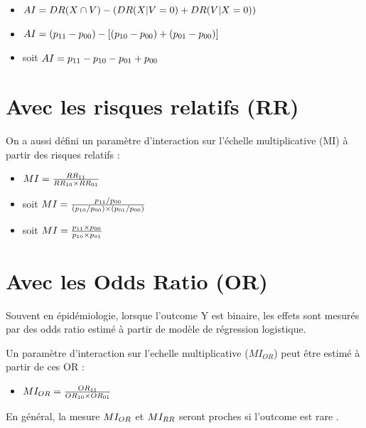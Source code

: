 \documentclass[
]{book}
\providecommand{\tightlist}{%
  \setlength{\itemsep}{0pt}\setlength{\parskip}{0pt}}
\begin{document}
\begin{itemize}
\tightlist
\item
  \(\small AI = DR(X\cap V) - (DR(X|V=0) + DR(V|X=0))\)
\item
  \(\small AI = (p_{11} - p_{00}) - [(p_{10} - p_{00}) + (p_{01} - p_{00})]\)
\item
  soit \(\small AI =p_{11} - p_{10} - p_{01} + p_{00}\)
\end{itemize}

\hypertarget{avec-les-risques-relatifs-rr}{%
\section{Avec les risques relatifs (RR)}\label{avec-les-risques-relatifs-rr}}

On a aussi défini un paramètre d'interaction sur l'échelle multiplicative (MI) à partir des risques relatifs \citet{vanderweele_tutorial_2014} :

\begin{itemize}
\tightlist
\item
  \(\small MI = \frac{RR_{11}}{RR_{10} \times RR_{01}}\)
\item
  soit \(\small MI = \frac{p_{11} / p_{00}}{(p_{10} / p_{00}) \times (p_{01} / p_{00})}\)
\item
  soit \(\small MI = \frac{p_{11} \times p_{00}}{p_{10} \times p_{01}}\)
\end{itemize}

\hypertarget{avec-les-odds-ratio-or}{%
\section{Avec les Odds Ratio (OR)}\label{avec-les-odds-ratio-or}}

Souvent en épidémiologie, lorsque l'outcome Y est binaire, les effets sont mesurés par des odds ratio estimé à partir de modèle de régression logistique.

Un paramètre d'interaction sur l'echelle multiplicative (\(MI_{OR}\)) peut être estimé à partir de ces OR \citet{vanderweele_tutorial_2014} :

\begin{itemize}
\tightlist
\item
  \(\small MI_{OR} = \frac{OR_{11}}{OR_{10} \times OR_{01}}\)
\end{itemize}

En général, la mesure \(\small MI_{OR}\) et \(\small MI_{RR}\) seront proches si l'outcome est rare \citet{vanderweele_tutorial_2014}.
\end{document}
